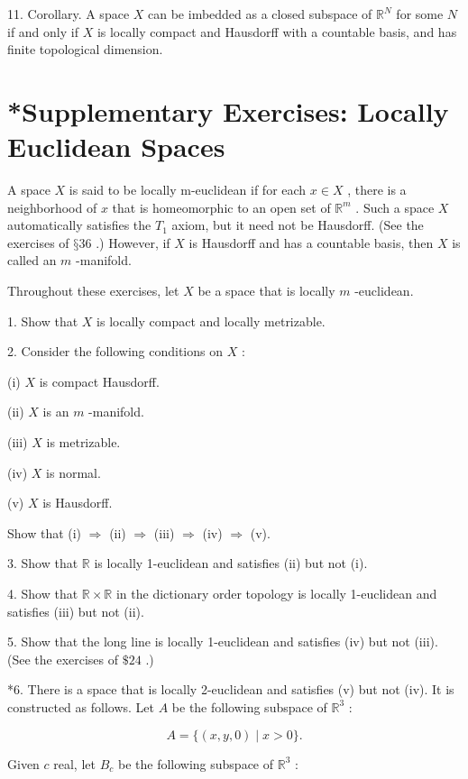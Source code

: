 11. Corollary. A space \(X\) can be imbedded as a closed subspace of \({\mathbb{R}}^{N}\) for some \(N\) if and only if \(X\) is locally compact and Hausdorff with a countable basis, and has finite topological dimension.

\section*{*Supplementary Exercises: Locally Euclidean Spaces}

A space \(X\) is said to be locally m-euclidean if for each \(x \in  X\) , there is a neighborhood of \(x\) that is homeomorphic to an open set of \({\mathbb{R}}^{m}\) . Such a space \(X\) automatically satisfies the \({T}_{1}\) axiom, but it need not be Hausdorff. (See the exercises of \(§{36}\) .) However, if \(X\) is Hausdorff and has a countable basis, then \(X\) is called an \(m\) -manifold.

Throughout these exercises, let \(X\) be a space that is locally \(m\) -euclidean.

1. Show that \(X\) is locally compact and locally metrizable.

2. Consider the following conditions on \(X\) :

(i) \(X\) is compact Hausdorff.

(ii) \(X\) is an \(m\) -manifold.

(iii) \(X\) is metrizable.

(iv) \(X\) is normal.

(v) \(X\) is Hausdorff.

Show that (i) \(\Rightarrow\) (ii) \(\Rightarrow\) (iii) \(\Rightarrow\) (iv) \(\Rightarrow\) (v).

3. Show that \(\mathbb{R}\) is locally 1-euclidean and satisfies (ii) but not (i).

4. Show that \(\mathbb{R} \times  \mathbb{R}\) in the dictionary order topology is locally 1-euclidean and satisfies (iii) but not (ii).

5. Show that the long line is locally 1-euclidean and satisfies (iv) but not (iii). (See the exercises of \(\$ {24}\) .)

*6. There is a space that is locally 2-euclidean and satisfies (v) but not (iv). It is constructed as follows. Let \(A\) be the following subspace of \({\mathbb{R}}^{3}\) :

\[
A = \{ \left( {x,y,0}\right)  \mid  x > 0\} .
\]

Given \(c\) real, let \({B}_{c}\) be the following subspace of \({\mathbb{R}}^{3}\) :

